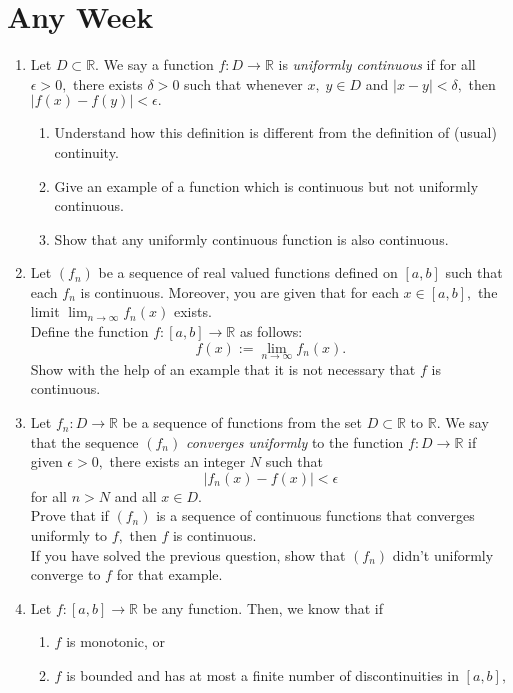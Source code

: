 \documentclass{article}
\begin{document}
\section{Any Week}
\begin{enumerate} 
	\item Let $D \subset \mathbb{R}.$ We say a function $f : D \to \mathbb{R}$ is \emph{uniformly continuous} if for all $\epsilon > 0,$ there exists $\delta > 0$ such that whenever $x,\;y \in D$ and $|x - y| < \delta,$ then $|f(x) - f(y)| < \epsilon.$
	\begin{enumerate} 
		\item Understand how this definition is different from the definition of (usual) continuity.
		\item Give an example of a function which is continuous but not uniformly continuous.
		\item Show that any uniformly continuous function is also continuous.
	\end{enumerate}
	\item Let $(f_n)$ be a sequence of real valued functions defined on $[a, b]$ such that each $f_n$ is continuous. Moreover, you are given that for each $x \in [a, b],$ the limit $\displaystyle\lim_{n\to \infty}f_n(x)$ exists. \\
	Define the function $f : [a, b] \to \mathbb{R}$ as follows:
	\[f(x) := \lim_{n\to \infty}f_n(x).\]
	Show with the help of an example that it is not necessary that $f$ is continuous.
	\item Let $f_n : D \to \mathbb{R}$ be a sequence of functions from the set $D \subset \mathbb{R}$ to $\mathbb{R}.$ We say that the sequence $(f_n)$ \emph{converges uniformly} to the function $f:D \to \mathbb{R}$ if given $\epsilon > 0,$ there exists an integer $N$ such that
	\[|f_n(x) - f(x)| < \epsilon\]
	for all $n > N$ and all $x \in D.$\\
	Prove that if $(f_n)$ is a sequence of continuous functions that converges uniformly to $f,$ then $f$ is continuous.\\
	If you have solved the previous question, show that $(f_n)$ didn't uniformly converge to $f$ for that example.
	\item Let $f:[a, b] \to \mathbb{R}$ be any function. Then, we know that if
	\begin{enumerate} 
		\item $f$ is monotonic, or
		\item $f$ is bounded and has at most a finite number of discontinuities in $[a, b],$
	\end{enumerate}

\end{enumerate}
\end{document}

